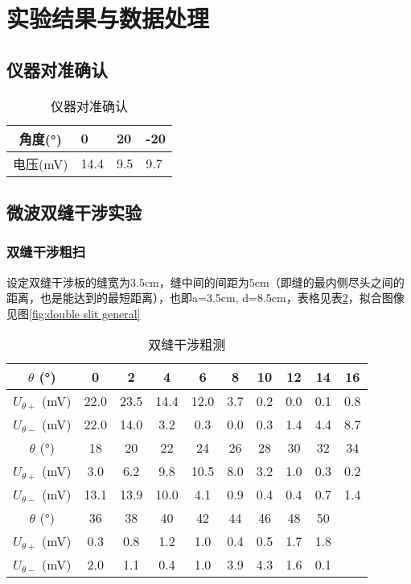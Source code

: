 \documentclass[11pt]{article}
\begin{document}
	
	
	\section{实验结果与数据处理}
	
	
	\subsection{仪器对准确认}

	\begin{table}[h!]
		\centering
		\begin{tabular}{|l|l|l|l|}
			\hline
			\multicolumn{1}{|c|}{角度(°)} & 0    & 20  & -20 \\ \hline
			电压(mV)                      & 14.4 & 9.5 & 9.7 \\ \hline
		\end{tabular}
		\caption{仪器对准确认}
		\label{tab: alignment}
	\end{table}
	
	
	\subsection{微波双缝干涉实验}
	
	\subsubsection{双缝干涉粗扫}
	
	设定双缝干涉板的缝宽为$3.5$cm，缝中间的间距为$5$cm（即缝的最内侧尽头之间的距离，也是能达到的最短距离），也即a=3.5cm, d=8.5cm，表格见表\ref{tab:double slit general}，拟合图像见图\ref{fig:double slit general}
	\begin{table}[h!]
		\centering
		\begin{tabular}{|c|c|c|c|c|c|c|c|c|c|}
			\hline
			$\theta$ (°) & 0 & 2 & 4 & 6 & 8 & 10 & 12 & 14 & 16 \\ \hline
			$U_{\theta+}$ (mV) & 22.0 & 23.5 & 14.4 & 12.0 & 3.7 & 0.2 & 0.0 & 0.1 & 0.8 \\ \hline
			$U_{\theta-}$ (mV) & 22.0 & 14.0 & 3.2 & 0.3 & 0.0 & 0.3 & 1.4 & 4.4 & 8.7 \\ \hline
			$\theta$ (°) & 18 & 20 & 22 & 24 & 26 & 28 & 30 & 32 & 34 \\ \hline
			$U_{\theta+}$ (mV) & 3.0 & 6.2 & 9.8 & 10.5 & 8.0 & 3.2 & 1.0 & 0.3 & 0.2 \\ \hline
			$U_{\theta-}$ (mV) & 13.1 & 13.9 & 10.0 & 4.1 & 0.9 & 0.4 & 0.4 & 0.7 & 1.4 \\ \hline
			$\theta$ (°) & 36 & 38 & 40 & 42 & 44 & 46 & 48 & 50 &  \\ \hline
			$U_{\theta+}$ (mV) & 0.3 & 0.8 & 1.2 & 1.0 & 0.4 & 0.5 & 1.7 & 1.8 &  \\ \hline
			$U_{\theta-}$ (mV) & 2.0 & 1.1 & 0.4 & 1.0 & 3.9 & 4.3 & 1.6 & 0.1 &  \\ \hline
		\end{tabular}
		\caption{双缝干涉粗测}
		\label{tab:double slit general}
	\end{table}
		
\end{document}
